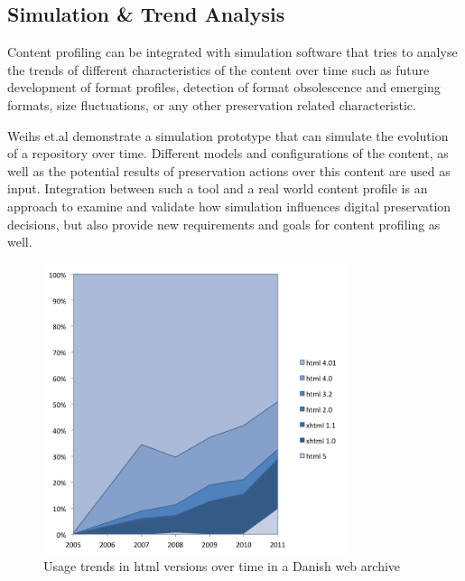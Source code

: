
\subsection{Simulation \& Trend Analysis}
Content profiling can be integrated with simulation software that tries to analyse the trends of different characteristics of the content over time such as future development of format profiles, detection of format obsolescence and emerging formats, size fluctuations, or any other preservation related characteristic.

Weihs et.al demonstrate a simulation prototype \cite{TUW-206758} that can simulate the evolution of a repository over time. Different models and configurations of the content, as well as the potential results of preservation actions over this content are used as input. Integration between such a tool and a real world content profile is an approach to examine and validate how simulation influences digital preservation decisions, but also provide new requirements and goals for content profiling  as well.

\begin{figure}[th]
\begin{center}
\includegraphics[width=3.5in]{figures/contentprofiling/trends_html.png}
\caption{Usage trends in html versions over time in a Danish web archive}
\label{fig:trends_html}
\end{center}
\end{figure}


